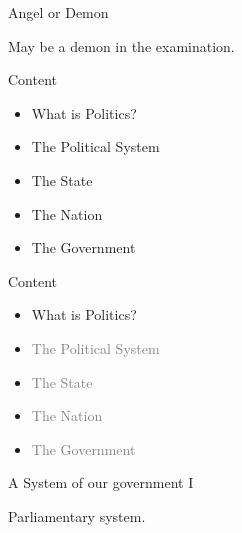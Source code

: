 \documentclass{beamer}
\begin{document}
\begin{frame}{Angel or Demon}
\begin{minipage}{0.45\textwidth}
\begin{center}
\end{center}
\begin{center}
May be a demon in the examination.
\end{center}
\end{minipage}
\end{frame}
\begin{frame}{Content}
\begin{itemize}
\item What is Politics?
\item The Political System
\item The State
\item The Nation
\item The Government
\end{itemize}
\end{frame}
\begin{frame}{Content}
\begin{itemize}
\item What is Politics?
\item \textcolor{gray}{The Political System}
\item \textcolor{gray}{The State}
\item \textcolor{gray}{The Nation}
\item \textcolor{gray}{The Government}
\end{itemize}
\end{frame}
\begin{frame}{A System of our government I}
\begin{center}
\end{center}
\begin{center}
Parliamentary system.
\end{center}
\end{frame}
\end{document}
